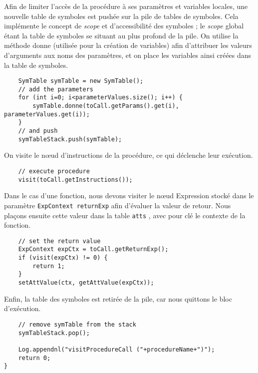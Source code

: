 \documentclass[a4paper,11pt]{article}
\begin{document}
Afin de limiter l'accès de la procédure à ses paramètres et variables locales, une nouvelle table de symboles est pushée sur la pile de tables de symboles. Cela implémente le concept de \textit{scope} et d'accessibilité des symboles ; le \textit{scope} global étant la table de symboles se situant au plus profond de la pile. On utilise la méthode donne (utilisée pour la création de variables) afin d'attribuer les valeurs d'arguments aux noms des paramètres, et on place les variables ainsi créées dans la table de symboles.

\begin{lstlisting}
    SymTable symTable = new SymTable();
    // add the parameters
    for (int i=0; i<parameterValues.size(); i++) {
        symTable.donne(toCall.getParams().get(i), parameterValues.get(i));
    }
    // and push
    symTableStack.push(symTable);
\end{lstlisting}

On visite le nœud d'instructions de la procédure, ce qui déclenche leur exécution.

\begin{lstlisting}
    // execute procedure
    visit(toCall.getInstructions());
\end{lstlisting}

Dans le cas d'une fonction, nous devons visiter le nœud Expression stocké dans le paramètre \lstinline$ExpContext returnExp$ afin d'évaluer la valeur de retour. Nous plaçons ensuite cette valeur dans la table \lstinline$atts$ , avec pour clé le contexte de la fonction.

\begin{lstlisting}
    // set the return value
    ExpContext expCtx = toCall.getReturnExp();
    if (visit(expCtx) != 0) {
        return 1;
    }
    setAttValue(ctx, getAttValue(expCtx));
\end{lstlisting}

Enfin, la table des symboles est retirée de la pile, car nous quittons le bloc d'exécution.

\begin{lstlisting}
    // remove symTable from the stack
    symTableStack.pop();
    
    Log.appendnl("visitProcedureCall ("+procedureName+")");
    return 0;
}
\end{lstlisting}

\end{document}
